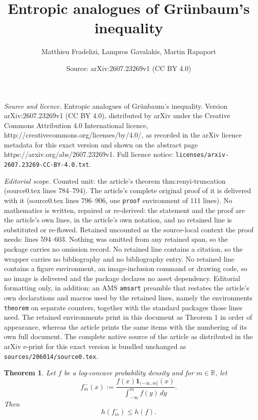 \documentclass[10pt,a4paper]{amsart}
\title{Entropic analogues of Gr{\"u}nbaum's inequality}
\author{Matthieu Fradelizi, Lampros Gavalakis, Martin Rapaport}
\date{Source: arXiv:2607.23269v1 (CC BY 4.0)}
\newtheorem{theorem}{Theorem}
\newcommand{\RL}{\mathbb{R}}
\begin{document}
\maketitle

\noindent\emph{Source and licence.} Entropic analogues of Gr{\"u}nbaum's inequality. Version arXiv:2607.23269v1 (CC BY 4.0), distributed by arXiv under the Creative Commons Attribution 4.0 International licence, http://creativecommons.org/licenses/by/4.0/, as recorded in the arXiv licence metadata for this exact version and shown on the abstract page https://arxiv.org/abs/2607.23269v1. Full licence notice: \texttt{licenses/arxiv-2607.23269-CC-BY-4.0.txt}.\par\smallskip

\noindent\textit{Editorial scope.} Counted unit: the article's theorem thm:renyi-truncation (source0.tex lines 784--794). The article's complete original proof of it is delivered with it (source0.tex lines 796--906, one \texttt{proof} environment of 111 lines). No mathematics is written, repaired or re-derived: the statement and the proof are the article's own lines, in the article's own notation, and no retained line is substituted or re-flowed.  Retained uncounted as the source-local context the proof needs: lines 594--603.  Nothing was omitted from any retained span, so the package carries no omission record.  No retained line contains a citation, so the wrapper carries no bibliography and no bibliography entry.  No retained line contains a figure environment, an image-inclusion command or drawing code, so no image is delivered and the package declares no asset dependency.  Editorial formatting only, in addition: an AMS \texttt{amsart} preamble that restates the article's own declarations and macros used by the retained lines, namely the environments \texttt{theorem} on separate counters, together with the standard packages those lines need.  The retained environments print in this document as Theorem 1 in order of appearance, whereas the article prints the same items with the numbering of its own full document.  The complete native source of the article as distributed in the arXiv e-print for this exact version is bundled unchanged as \texttt{sources/206014/source0.tex}.
\begin{theorem}\label{entropygrunbaumTh}
Let $f$ be a log-concave probability density and for $m \in \RL$, let 
\[
f_{m}^-(x):=\frac{f(x)\mathbf 1_{(-\infty,m]}(x)}{\int_{-\infty}^{m} f(y)\,dy}.
\]
Then
\[
h(f_{m}^-)\le h(f).
\]
\end{theorem}
\end{document}

